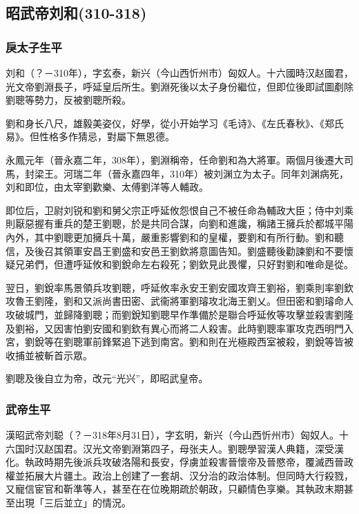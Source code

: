 
\subsection{昭武帝刘和\tiny(310-318)}

\subsubsection{戾太子生平}

刘和（？－310年），字玄泰，新兴（今山西忻州市）匈奴人。十六國時汉赵國君，光文帝劉淵長子，呼延皇后所生。劉淵死後以太子身份繼位，但即位後即試圖剷除劉聰等勢力，反被劉聰所殺。

劉和身长八尺，雄毅美姿仪，好學，從小开始学习《毛诗》、《左氏春秋》、《郑氏易》。但性格多作猜忌，對屬下無恩德。

永鳳元年（晉永嘉二年，308年），劉淵稱帝，任命劉和為大將軍。兩個月後遷大司馬，封梁王。河瑞二年（晉永嘉四年，310年）被刘渊立为太子。同年刘渊病死，刘和即位，由太宰劉歡樂、太傅劉洋等人輔政。

即位后，卫尉刘锐和劉和舅父宗正呼延攸怨恨自己不被任命為輔政大臣；侍中刘乘則厭惡握有重兵的楚王劉聰，於是共同合謀，向劉和進讒，稱諸王擁兵於都城平陽內外，其中劉聰更加擁兵十萬，嚴重影響劉和的皇權，要劉和有所行動。劉和聽信，及後召其領軍安昌王劉盛和安邑王劉欽將意圖告知。劉盛聽後勸諫劉和不要懷疑兄弟們，但遭呼延攸和劉銳命左右殺死；劉欽見此畏懼，只好對劉和唯命是從。

翌日，劉銳率馬景領兵攻劉聰，呼延攸率永安王劉安國攻齊王劉裕，劉乘則率劉欽攻魯王劉隆，劉和又派尚書田密、武衞將軍劉璿攻北海王劉乂。但田密和劉璿命人攻破城門，並歸降劉聰；而劉銳知劉聰早作準備於是聯合呼延攸等攻擊並殺害劉隆及劉裕，又因害怕劉安國和劉欽有異心而將二人殺害。此時劉聰率軍攻克西明門入宮，劉銳等在劉聰軍前鋒緊追下逃到南宮。劉和則在光極殿西室被殺，劉銳等皆被收捕並被斬首示眾。

劉聰及後自立为帝，改元“光兴”，即昭武皇帝。

\subsubsection{武帝生平}

漢昭武帝刘聪（？－318年8月31日），字玄明，新兴（今山西忻州市）匈奴人。十六国时汉赵国君。汉光文帝劉淵第四子，母张夫人。劉聰學習漢人典籍，深受漢化。執政時期先後派兵攻破洛陽和長安，俘虜並殺害晉懷帝及晉愍帝，覆滅西晉政權並拓展大片疆土。政治上创建了一套胡、汉分治的政治体制。但同時大行殺戮，又寵信宦官和靳準等人，甚至在在位晚期疏於朝政，只顧情色享樂。其執政末期甚至出現「三后並立」的情況。

